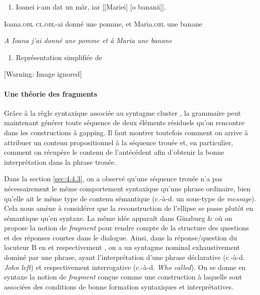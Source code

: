 \begin{enumerate}
\item \label{bkm:Ref299889957}Ioanei i-am dat un măr, iar [[Mariei] [o banană]]. 


\end{enumerate}
    Ioana.\textsc{obl cl.obl}-ai donné une pomme, et Maria\textsc{.obl} une banane

     \textit{A Ioana j'ai donné une pomme et à Maria une banane}


\begin{enumerate}
\item \label{bkm:Ref299900245}Représentation simplifiée de 


\end{enumerate}
{   [Warning: Image ignored] %
} 

\paragraph[Une théorie des fragments]{Une théorie des fragments}
\label{bkm:Ref302389353}Grâce à la règle syntaxique associée au syntagme cluster , la grammaire peut maintenant générer toute séquence de deux éléments résiduels qu'on rencontre dans les constructions à gapping. Il faut montrer toutefois comment on arrive à attribuer un contenu propositionnel à la séquence trouée et, en particulier, comment on récupère le contenu de l'antécédent afin d'obtenir la bonne interprétation dans la phrase trouée. 

Dans la section \ref{sec:4.4.3}, on a observé qu'une séquence trouée n'a pas nécessairement le même comportement syntaxique qu'une phrase ordinaire, bien qu'elle ait le même type de contenu sémantique (c.-à-d. un sous-type de \textit{message}). Cela nous amène à considérer que la reconstruction de l'ellipse se passe plutôt en sémantique qu'en syntaxe. La même idée apparaît dans Ginzburg \& \citet{Sag2000} où on propose la notion de \textit{fragment} pour rendre compte de la structure des questions et des réponses courtes dans le dialogue. Ainsi, dans la réponse/question du locuteur B en  et respectivement , on a un syntagme nominal exhaustivement dominé par une phrase, ayant l'interprétation d'une phrase déclarative (c.-à-d. \textit{John left}) et respectivement interrogative (c.-à-d. \textit{Who called}). On se donne en syntaxe la notion de \textit{fragment} conçue comme une construction à laquelle sont associées des conditions de bonne formation syntaxiques et interprétatives.


